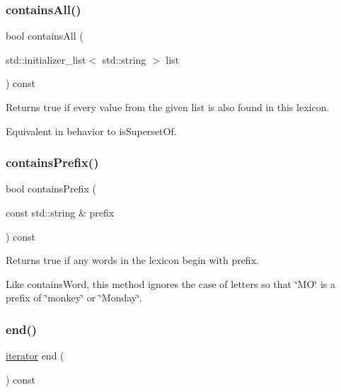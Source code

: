\subsubsection{\texorpdfstring{contains\+All()}{containsAll()}\hspace{0.1cm}{\footnotesize\ttfamily [2/2]}}
{\footnotesize\ttfamily bool contains\+All (\begin{DoxyParamCaption}\item[{std\+::initializer\+\_\+list$<$ std\+::string $>$}]{list }\end{DoxyParamCaption}) const}



Returns {\ttfamily true} if every value from the given list is also found in this lexicon. 

Equivalent in behavior to is\+Superset\+Of. \mbox{\label{classDawgLexicon_a0b8e0b0b6f72ba6b88b56bd074b1dc32}} 
\subsubsection{\texorpdfstring{contains\+Prefix()}{containsPrefix()}}
{\footnotesize\ttfamily bool contains\+Prefix (\begin{DoxyParamCaption}\item[{const std\+::string \&}]{prefix }\end{DoxyParamCaption}) const}



Returns true if any words in the lexicon begin with {\ttfamily prefix}. 

Like {\ttfamily contains\+Word}, this method ignores the case of letters so that \char`\"{}\+M\+O\char`\"{} is a prefix of \char`\"{}monkey\char`\"{} or \char`\"{}\+Monday\char`\"{}. \mbox{\label{classDawgLexicon_a68b688a51bd0cf6fb5bc2cba292209a8}} 
\subsubsection{\texorpdfstring{end()}{end()}}
{\footnotesize\ttfamily \mbox{\hyperlink{classDawgLexicon_1_1iterator}{iterator}} end (\begin{DoxyParamCaption}{ }\end{DoxyParamCaption}) const\hspace{0.3cm}{\ttfamily [inline]}}




